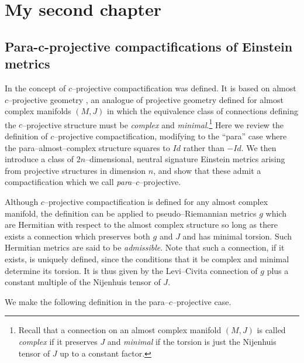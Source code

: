



\chapter{My second chapter}

\section{Para-c-projective compactifications of Einstein metrics} 
\label{section_c}

In \cite{CG} the concept of $c$--projective compactification was
defined. It is based on almost $c$--projective geometry \cite{c_proj},
an analogue of projective geometry defined for almost complex
manifolds $(M,J)$ in which the equivalence class of connections
defining the $c$--projective structure must be \textit{complex} and
\textit{minimal}.\footnote{Recall that a connection on an almost
  complex manifold $(M,J)$ is called \textit{complex} if it preserves
  $J$ and \textit{minimal} if the torsion is just the Nijenhuis tensor
  of $J$ up to a constant factor.} Here we review the definition of
$c$--projective compactification, modifying to the ``para'' case where
the para--almost--complex structure squares to $Id$ rather than $-Id$. We
then introduce a class of $2n$--dimensional, neutral signature
Einstein metrics arising from projective structures in dimension $n$,
and show that these admit a compactification which we call
\textit{para}--$c$--projective.

Although $c$--projective compactification is defined for any almost complex manifold, the definition can be applied to pseudo--Riemannian metrics $g$ which are Hermitian with respect to the almost complex structure so long as there exists a connection which preserves both $g$ and $J$ and has minimal torsion. Such Hermitian metrics are said to be \textit{admissible}.  Note that such a connection, if it exists, is uniquely defined, since the conditions that it be complex and minimal determine its torsion. It is thus given by the Levi--Civita connection of $g$ plus a constant multiple of the Nijenhuis tensor of $J$.

We make the following definition in the para--$c$--projective case.

